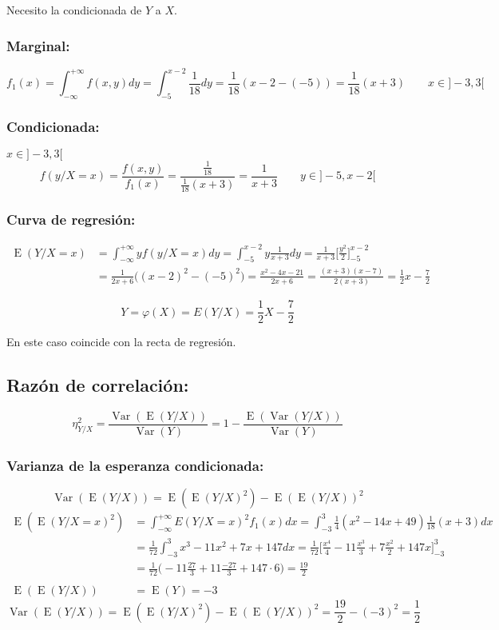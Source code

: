 \documentclass[tikz]{article}
\DeclareMathOperator{\Var}{Var}
\DeclareMathOperator{\E}{E}
\begin{document}
Necesito la condicionada de $Y$ a $X$.

\subsubsection*{Marginal:}
\[f_1(x)=\int_{-\infty}^{+\infty}f(x,y)dy=\int_{-5}^{x-2}\frac{1}{18}dy=\frac{1}{18}(x-2-(-5))=\frac{1}{18}(x+3) \qquad x\in]-3,3[\]

\subsubsection*{Condicionada:}
$x\in]-3,3[$
\[f(y/X=x)=\frac{f(x,y)}{f_1(x)}=\frac{\frac{1}{18}}{\frac{1}{18}(x+3)}=\frac{1}{x+3} \qquad y\in]-5,x-2[\]

\subsubsection*{Curva de regresión:}

\begin{align*}
  \E(Y/X=x)&=\int_{-\infty}^{+\infty}yf(y/X=x)dy=\int_{-5}^{x-2}y\frac{1}{x+3}dy=\frac{1}{x+3}\bigg[\frac{y^2}{2}\bigg]_{-5}^{x-2} \\
                  &=\frac{1}{2x+6}\Big((x-2)^2-(-5)^2\Big)=\frac{x^2-4x-21}{2x+6}=\frac{(x+3)(x-7)}{2(x+3)}=\frac{1}{2}x-\frac{7}{2}
\end{align*}

\[Y=\varphi(X)=E(Y/X)=\frac{1}{2}X-\frac{7}{2}\]

En este caso coincide con la recta de regresión.

\subsection*{Razón de correlación:}

\[\eta_{Y/X}^2=\frac{\Var(\E(Y/X))}{\Var(Y)}=1-\frac{\E(\Var(Y/X))}{\Var(Y)}\]

\subsubsection*{Varianza de la esperanza condicionada:}

\[\Var(\E(Y/X))=\E(\E(Y/X)^2)-\E(\E(Y/X))^2\]
\begin{align*}
  \E(\E(Y/X=x)^2)&=\int_{-\infty}^{+\infty}E(Y/X=x)^2f_1(x)dx=\int_{-3}^{3}\frac{1}{4}(x^2-14x+49)\frac{1}{18}(x+3)dx \\
                 &=\frac{1}{72}\int_{-3}^{3}x^3-11x^2+7x+147dx=\frac{1}{72}\bigg[\frac{x^4}{4}-11\frac{x^3}{3}+7\frac{x^2}{2}+147x\bigg]_{-3}^{3} \\
                 &=\frac{1}{72}\bigg(-11\frac{27}{3}+11\frac{-27}{3}+147 \cdot 6\bigg)=\frac{19}{2} \\
  ~ \\
  \E(\E(Y/X))&=\E(Y)=-3                 
\end{align*}
\[\Var(\E(Y/X))=\E(\E(Y/X)^2)-\E(\E(Y/X))^2=\frac{19}{2}-(-3)^2=\frac{1}{2}\]
\end{document}
